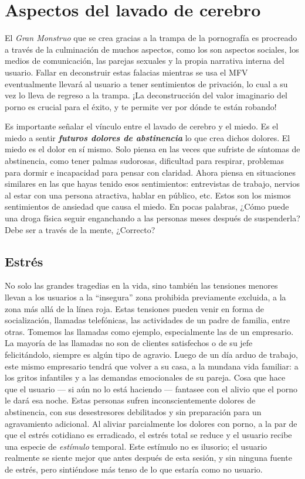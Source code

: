 \documentclass[
  spanish,
  openany]{book}
\begin{document}
\hypertarget{aspectos-del-lavado-de-cerebro}{%
\chapter{Aspectos del lavado de cerebro}\label{aspectos-del-lavado-de-cerebro}}

El \emph{Gran Monstruo} que se crea gracias a la trampa de la pornografía es procreado a través de la culminación de muchos aspectos, como los son aspectos sociales, los medios de comunicación, las parejas sexuales y la propia narrativa interna del usuario. Fallar en deconstruir estas falacias mientras se usa el MFV eventualmente llevará al usuario a tener sentimientos de privación, lo cual a su vez lo lleva de regreso a la trampa. ¡La deconstrucción del valor imaginario del porno es crucial para el éxito, y te permite ver por dónde te están robando!

Es importante señalar el vínculo entre el lavado de cerebro y el miedo. Es el miedo a sentir \emph{\textbf{futuros dolores de abstinencia}} lo que crea dichos dolores. El miedo es el dolor en sí mismo. Solo piensa en las veces que sufriste de síntomas de abstinencia, como tener palmas sudorosas, dificultad para respirar, problemas para dormir e incapacidad para pensar con claridad. Ahora piensa en situaciones similares en las que hayas tenido esos sentimientos: entrevistas de trabajo, nervios al estar con una persona atractiva, hablar en público, etc. Estos son los mismos sentimientos de ansiedad que causa el miedo. En pocas palabras, ¿Cómo puede una droga física seguir enganchando a las personas meses después de suspenderla? Debe ser a través de la mente, ¿Correcto?

\hypertarget{estruxe9s}{%
\section{Estrés}\label{estruxe9s}}

No solo las grandes tragedias en la vida, sino también las tensiones menores llevan a los usuarios a la ``insegura'' zona prohibida previamente excluida, a la zona más allá de la línea roja. Estas tensiones pueden venir en forma de socialización, llamadas telefónicas, las actividades de un padre de familia, entre otras. Tomemos las llamadas como ejemplo, especialmente las de un empresario. La mayoría de las llamadas no son de clientes satisfechos o de su jefe felicitándolo, siempre es algún tipo de agravio. Luego de un día arduo de trabajo, este mismo empresario tendrá que volver a su casa, a la mundana vida familiar: a los gritos infantiles y a las demandas emocionales de su pareja. Cosa que hace que el usuario --- si aún no lo está haciendo --- fantasee con el alivio que el porno le dará esa noche. Estas personas sufren inconscientemente dolores de abstinencia, con sus desestresores debilitados y sin preparación para un agravamiento adicional. Al aliviar parcialmente los dolores con porno, a la par de que el estrés cotidiano es erradicado, el estrés total se reduce y el usuario recibe una especie de \emph{estímulo} temporal. Este estímulo no es ilusorio; el usuario realmente se siente mejor que antes después de esta sesión, y sin ninguna fuente de estrés, pero sintiéndose más tenso de lo que estaría como no usuario.
\end{document}
